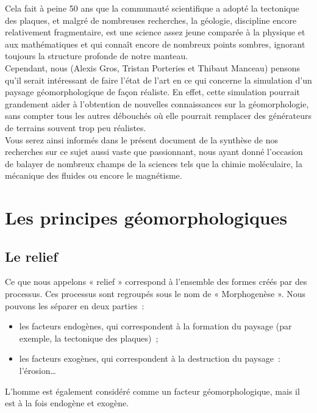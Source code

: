 \documentclass[a4paper,11pt]{article}
\begin{document}
Cela fait à peine 50 ans que la communauté scientifique a adopté la tectonique des plaques, et malgré de nombreuses recherches, la géologie, discipline encore relativement fragmentaire, est une science assez jeune comparée à la physique et aux mathématiques et qui connaît encore de nombreux points sombres, ignorant toujours la structure profonde de notre manteau. \\
Cependant, nous (Alexis Gros, Tristan Porteries et Thibaut Manceau) pensons qu'il serait intéressant de faire l'état de l'art en ce qui concerne la simulation d'un paysage géomorphologique de façon réaliste.
En effet, cette simulation pourrait grandement aider à l'obtention de nouvelles connaissances sur la géomorphologie, sans compter tous les autres débouchés où elle pourrait remplacer des générateurs de terrains souvent trop peu réalistes. \\
Vous serez ainsi informés dans le présent document de la synthèse de nos recherches sur ce sujet aussi vaste que passionnant, nous ayant donné l'occasion de balayer de nombreux champs de la sciences tels que la chimie moléculaire, la mécanique des fluides ou encore le magnétisme.

\section{Les principes géomorphologiques}

\subsection{Le relief}

Ce que nous appelons « relief » correspond à l'ensemble des formes créés par des processus.
Ces processus sont regroupés sous le nom de « Morphogenèse ».
Nous pouvons les séparer en deux parties~:
\begin{itemize}
  \item les facteurs endogènes, qui correspondent à la formation du paysage (par exemple, la tectonique des plaques)~;
  \item les facteurs exogènes, qui correspondent à la destruction du paysage~: l'érosion\ldots
\end{itemize}
L'homme est également considéré comme un facteur géomorphologique, mais il est à la fois endogène et exogène. \\
\end{document}
